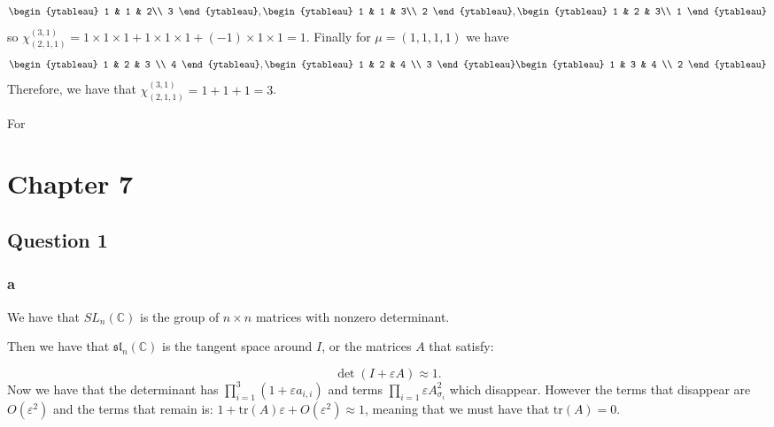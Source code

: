 \documentclass[]{article}
\newcommand{\tr}{\text{tr}}
\begin{document}
\begin{equation}
	\begin{ytableau}
		1 & 1 & 2\\
		3
	\end{ytableau}
	,
	\begin{ytableau}
	1 & 1 & 3\\
	2
\end{ytableau}
,
	\begin{ytableau}
	1 & 2 & 3\\
	1
\end{ytableau}
\end{equation}
so 
$\chi^{(3,1)}_{(2,1,1)} = 1 \times 1 \times 1 + 1 \times 1 \times 1 + (-1) \times 1 \times 1 = 1$. 
Finally for $\mu = (1,1,1,1)$ we have 
\begin{equation}
	\begin{ytableau}
		1 & 2 & 3 \\
		4
	\end{ytableau}
	,
	\begin{ytableau}
	1 & 2 & 4 \\
	3
\end{ytableau}
	\begin{ytableau}
	1 & 3 & 4 \\
	2
\end{ytableau}
\end{equation}
Therefore, we have that $\chi^{(3,1)}_{(2,1,1)} = 1 + 1 + 1 = 3$. 


For 

\section*{Chapter 7}
\subsection*{Question 1}

\subsubsection*{a}
We have that $SL_n(\mathbb{C})$ is the group of $n \times n$ matrices with nonzero determinant. 

Then we have that $\mathfrak{sl}_n(\mathbb{C})$ is the tangent space around $I$, or the matrices $A$ that satisfy:

\begin{equation}
	\det \left(I + \varepsilon A\right) \approx 1.
\end{equation}
Now we have that the determinant has $\prod_{i = 1}^3 ( 1 + \varepsilon a_{i,i})$ and terms $\prod_{i = 1} \varepsilon A_{\sigma_i}^2$ which disappear. However the terms that disappear are $O(\varepsilon^2)$ and the terms that remain is: $1 + \tr(A) \varepsilon + O(\varepsilon^2) \approx 1$, meaning that we must have that $\tr(A) = 0$. 
\end{document}
